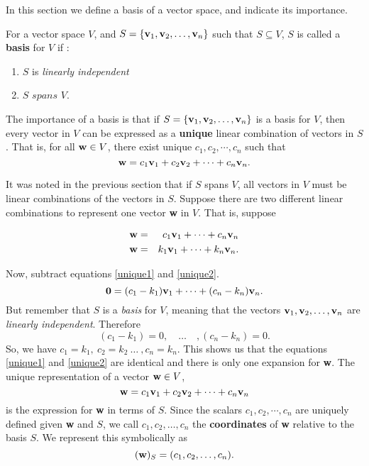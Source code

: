 In this section we define a basis of a vector space, and indicate
its importance.

For a vector space $V$, and $S=\{{\bf v}_1,{\bf v}_2, \ldots, {\bf
v}_n\}$ such that $S \subseteq V$, $S$ is called a {\bf basis} for
$V$ if :
\begin{enumerate}
\item $S$ is \textit{linearly independent}
\item $S$ $spans$ $V$.
\end{enumerate}


The importance of a basis is that if $S=\{{\bf v}_1,{\bf v}_2,
\ldots, {\bf v}_n\}$ is a basis for $V$, then every vector in $V$
can be expressed as a {\bf unique} linear combination of vectors
in $S$. That is, for all ${\bf w} \in V$, there exist unique
$c_1,c_2,\cdots, c_n$ such that
$${\bf w}=c_1{\bf v}_1+c_2{\bf v}_2+\cdots+c_n{\bf v}_n.$$

It was noted in the previous section that if $S$ spans $V$, all
vectors in $V$ must be linear combinations of the vectors in $S$.
Suppose there are two different linear combinations to represent
one vector {\bf w} in $V$.  That is, suppose

\begin{eqnarray}
\label{unique1} {\bf w}&=& c_1{\bf v}_1+ \cdots +c_n{\bf v}_n\\
\label{unique2} {\bf w}&=& k_1{\bf v}_1+ \cdots +k_n{\bf v}_n.
\end{eqnarray}

Now, subtract equations \ref{unique1} and \ref{unique2}.  $${\bf
0}=(c_1-k_1){\bf v}_1 +\cdots +(c_n-k_n){\bf v}_n.$$ But remember
that $S$ is a \textit{basis} for $V$, meaning that the vectors
${\bf v}_1, {\bf v}_2, \ldots, {\bf v}_n$ are \textit{linearly
independent}. Therefore $$(c_1-k_1)=0,\quad \ldots
\quad,(c_n-k_n)=0.$$ So, we have $c_1=k_1, \ c_2=k_2 \ \ldots \
,c_n=k_n$. This shows us that the equations \ref{unique1} and
\ref{unique2} are identical and there is only one expansion for
{\bf w}. The unique representation of a vector ${\bf w} \in V$,
$${\bf w}=c_1{\bf v}_1+c_2{\bf v}_2+\cdots+c_n{\bf v}_n$$ is the
expression for {\bf w} in terms of $S$. Since the scalars
$c_1,c_2,\cdots,c_n$ are uniquely defined given {\bf w} and $S$,
we call $c_1,c_2,\ldots,c_n$ the {\bf coordinates} of {\bf w}
relative to the basis $S$. We represent this symbolically as
$$({\bf w})_S=(c_1,c_2,\ldots, c_n).$$

